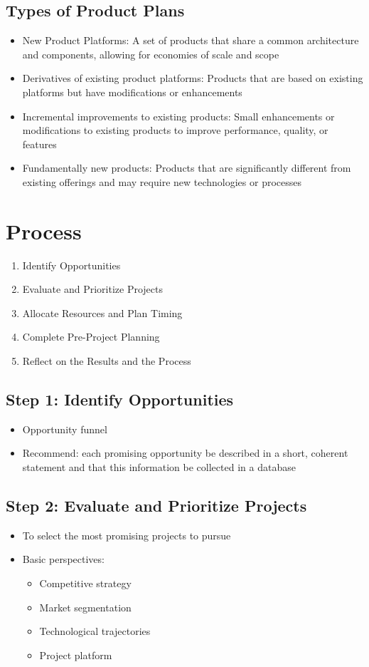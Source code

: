 \documentclass[openany,12pt,a4paper]{book}
\begin{document}
\subsection{Types of Product Plans}
\begin{itemize}
    \item New Product Platforms: A set of products that share a common architecture and components, allowing for economies of scale and scope
    \item Derivatives of existing product platforms: Products that are based on existing platforms but have modifications or enhancements
    \item Incremental improvements to existing products: Small enhancements or modifications to existing products to improve performance, quality, or features
    \item Fundamentally new products: Products that are significantly different from existing offerings and may require new technologies or processes
\end{itemize}
\section{Process}
\begin{enumerate}
    \item Identify Opportunities
    \item Evaluate and Prioritize Projects
    \item Allocate Resources and Plan Timing
    \item Complete Pre-Project Planning
    \item Reflect on the Results and the Process
\end{enumerate}
\subsection{Step 1: Identify Opportunities}
\begin{itemize}
    \item Opportunity funnel
    \item Recommend: each promising opportunity be described in a short, coherent statement and that this information be collected in a database
\end{itemize}

\subsection{Step 2: Evaluate and Prioritize Projects}
\begin{itemize}
    \item To select the most promising projects to pursue
    \item Basic perspectives:
    \begin{itemize}
        \item Competitive strategy
        \item Market segmentation 
        \item Technological trajectories
        \item Project platform
    \end{itemize}
\end{itemize}
\end{document}
